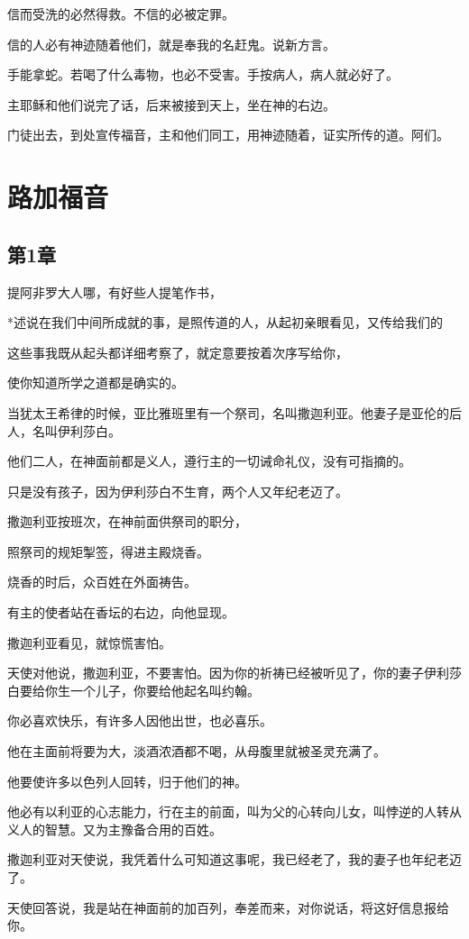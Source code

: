 \documentclass[12pt,oneside]{book}
\begin{document}
信而受洗的必然得救。不信的必被定罪。

信的人必有神迹随着他们，就是奉我的名赶鬼。说新方言。

手能拿蛇。若喝了什么毒物，也必不受害。手按病人，病人就必好了。

主耶稣和他们说完了话，后来被接到天上，坐在神的右边。

门徒出去，到处宣传福音，主和他们同工，用神迹随着，证实所传的道。阿们。

\part{路加福音}
\chapter{第1章}
提阿非罗大人哪，有好些人提笔作书，

*述说在我们中间所成就的事，是照传道的人，从起初亲眼看见，又传给我们的

这些事我既从起头都详细考察了，就定意要按着次序写给你，

使你知道所学之道都是确实的。

当犹太王希律的时候，亚比雅班里有一个祭司，名叫撒迦利亚。他妻子是亚伦的后人，名叫伊利莎白。

他们二人，在神面前都是义人，遵行主的一切诫命礼仪，没有可指摘的。

只是没有孩子，因为伊利莎白不生育，两个人又年纪老迈了。

撒迦利亚按班次，在神前面供祭司的职分，

照祭司的规矩掣签，得进主殿烧香。

烧香的时后，众百姓在外面祷告。

有主的使者站在香坛的右边，向他显现。

撒迦利亚看见，就惊慌害怕。

天使对他说，撒迦利亚，不要害怕。因为你的祈祷已经被听见了，你的妻子伊利莎白要给你生一个儿子，你要给他起名叫约翰。

你必喜欢快乐，有许多人因他出世，也必喜乐。

他在主面前将要为大，淡酒浓酒都不喝，从母腹里就被圣灵充满了。

他要使许多以色列人回转，归于他们的神。

他必有以利亚的心志能力，行在主的前面，叫为父的心转向儿女，叫悖逆的人转从义人的智慧。又为主豫备合用的百姓。

撒迦利亚对天使说，我凭着什么可知道这事呢，我已经老了，我的妻子也年纪老迈了。

天使回答说，我是站在神面前的加百列，奉差而来，对你说话，将这好信息报给你。
\end{document}
